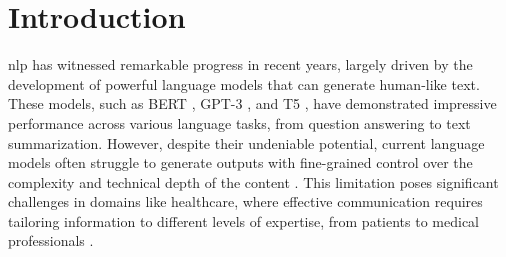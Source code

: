 \chapter{Introduction}
\label{c1}

\gls{nlp} has witnessed remarkable progress in recent years, largely driven by the development of powerful language models that can generate human-like text. These models, such as BERT \cite{devlin2018bert}, GPT-3 \cite{brown2020language}, and T5 \cite{raffel2020exploring}, have demonstrated impressive performance across various language tasks, from question answering to text summarization. However, despite their undeniable potential, current language models often struggle to generate outputs with fine-grained control over the complexity and technical depth of the content \cite{zhang2022survey, liuControllingNeuralText2022}. This limitation poses significant challenges in domains like healthcare, where effective communication requires tailoring information to different levels of expertise, from patients to medical professionals \cite{wittenberg2017simplifying}.

